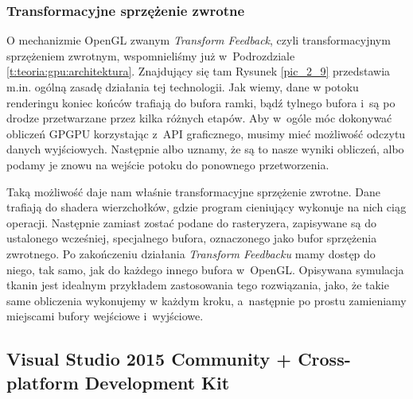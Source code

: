 			\subsubsection{Transformacyjne sprzężenie zwrotne}
			\label{t:technologie:narzedzia:transformfeedback}
			
			O mechanizmie OpenGL zwanym \emph{Transform Feedback}, czyli transformacyjnym sprzężeniem zwrotnym, wspomnieliśmy już w~Podrozdziale \ref{t:teoria:gpu:architektura}. Znajdujący się tam Rysunek \ref{pic_2_9} przedstawia m.in. ogólną zasadę działania tej technologii. Jak wiemy, dane w potoku renderingu koniec końców trafiają do bufora ramki, bądź tylnego bufora i~są po drodze przetwarzane przez kilka różnych etapów. Aby w~ogóle móc dokonywać obliczeń GPGPU korzystając z~API graficznego, musimy mieć możliwość odczytu danych wyjściowych. Następnie albo uznamy, że są to nasze wyniki obliczeń, albo podamy je znowu na wejście potoku do ponownego przetworzenia. 
			
			Taką możliwość daje nam właśnie transformacyjne sprzężenie zwrotne. Dane trafiają do shadera wierzchołków, gdzie program cieniujący wykonuje na nich ciąg operacji. Następnie zamiast zostać podane do rasteryzera, zapisywane są do ustalonego wcześniej, specjalnego bufora, oznaczonego jako bufor sprzężenia zwrotnego. Po zakończeniu działania \emph{Transform Feedbacku} mamy dostęp do niego, tak samo, jak do każdego innego bufora w~OpenGL. Opisywana symulacja tkanin jest idealnym przykładem zastosowania tego rozwiązania, jako, że takie same obliczenia wykonujemy w każdym kroku, a~następnie po prostu zamieniamy miejscami bufory wejściowe i~wyjściowe. 
		
		
		\subsection{Visual Studio 2015 Community + Cross-platform Development Kit}
		\label{t:technologie:narzedzia:vs}
		
		
